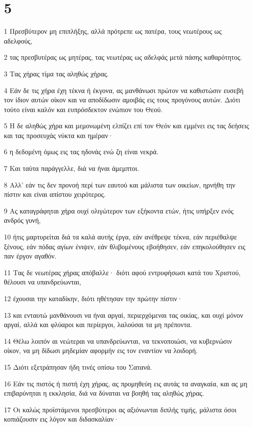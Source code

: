 \chapter{5}

\par 1 Πρεσβύτερον μη επιπλήξης, αλλά πρότρεπε ως πατέρα, τους νεωτέρους ως αδελφούς,
\par 2 τας πρεσβυτέρας ως μητέρας, τας νεωτέρας ως αδελφάς μετά πάσης καθαρότητος.
\par 3 Τας χήρας τίμα τας αληθώς χήρας.
\par 4 Εάν δε τις χήρα έχη τέκνα ή έκγονα, ας μανθάνωσι πρώτον να καθιστώσιν ευσεβή τον ίδιον αυτών οίκον και να αποδίδωσιν αμοιβάς εις τους προγόνους αυτών. Διότι τούτο είναι καλόν και ευπρόσδεκτον ενώπιον του Θεού.
\par 5 Η δε αληθώς χήρα και μεμονωμένη ελπίζει επί τον Θεόν και εμμένει εις τας δεήσεις και τας προσευχάς νύκτα και ημέραν·
\par 6 η δεδομένη όμως εις τας ηδονάς ενώ ζη είναι νεκρά.
\par 7 Και ταύτα παράγγελλε, διά να ήναι άμεμπτοι.
\par 8 Αλλ' εάν τις δεν προνοή περί των εαυτού και μάλιστα των οικείων, ηρνήθη την πίστιν και είναι απίστου χειρότερος.
\par 9 Ας καταγράφηται χήρα ουχί ολιγώτερον των εξήκοντα ετών, ήτις υπήρξεν ενός ανδρός γυνή,
\par 10 ήτις μαρτυρείται διά τα καλά αυτής έργα, εάν ανέθρεψε τέκνα, εάν περιέθαλψε ξένους, εάν πόδας αγίων ένιψεν, εάν θλιβομένους εβοήθησεν, εάν επηκολούθησεν εις παν έργον αγαθόν.
\par 11 Τας δε νεωτέρας χήρας απόβαλλε· διότι αφού εντρυφήσωσι κατά του Χριστού, θέλουσι να υπανδρεύωνται,
\par 12 έχουσαι την καταδίκην, διότι ηθέτησαν την πρώτην πίστιν·
\par 13 και ενταυτώ μανθάνουσι να ήναι αργαί, περιερχόμεναι τας οικίας, και ουχί μόνον αργαί, αλλά και φλύαροι και περίεργοι, λαλούσαι τα μη πρέποντα.
\par 14 Θέλω λοιπόν αι νεώτεραι να υπανδρεύωνται, να τεκνοποιώσι, να κυβερνώσιν οίκον, να μη δίδωσι μηδεμίαν αφορμήν εις τον εναντίον να λοιδορή.
\par 15 Διότι εξετράπησαν ήδη τινές οπίσω του Σατανά.
\par 16 Εάν τις πιστός ή πιστή έχη χήρας, ας προμηθεύη εις αυτάς τα αναγκαία, και ας μη επιβαρύνηται η εκκλησία, διά να δύναται να βοηθή τας αληθώς χήρας.
\par 17 Οι καλώς προϊστάμενοι πρεσβύτεροι ας αξιόνωνται διπλής τιμής, μάλιστα όσοι κοπιάζουσιν εις λόγον και διδασκαλίαν·
